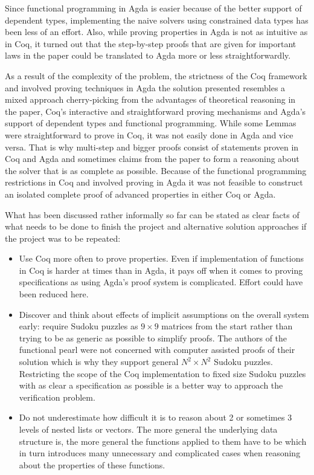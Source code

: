 \documentclass[a4paper,11pt]{article}
\begin{document}
Since functional programming in Agda is easier because of the better support of dependent types, implementing the naive solvers using constrained data types has been less of an effort. Also, while proving properties in Agda is not as intuitive as in Coq, it turned out that the step-by-step proofs that are given for important laws in the paper could be translated to Agda more or less straightforwardly. 

As a result of the complexity of the problem, the strictness of the Coq framework and involved proving techniques in Agda the solution presented resembles a mixed approach cherry-picking from the advantages of theoretical reasoning in the paper, Coq's interactive and straightforward proving mechanisms and Agda's support of dependent types and functional programming. While some Lemmas were straightforward to prove in Coq, it was not easily done in Agda and vice versa. That is why multi-step and bigger proofs consist of statements proven in Coq and Agda and sometimes claims from the paper to form a reasoning about the solver that is as complete as possible. Because of the functional programming restrictions in Coq and involved proving in Agda it was not feasible to construct an isolated complete proof of advanced properties in either Coq or Agda.

What has been discussed rather informally so far can be stated as clear facts of what needs to be done to finish the project and alternative solution approaches if the project was to be repeated:
\begin{itemize}
  \item Use Coq more often to prove properties. Even if implementation of functions in Coq is harder at times than in Agda, it pays off when it comes to proving specifications as using Agda's proof system is complicated. Effort could have been reduced here.
  \item Discover and think about effects of implicit assumptions on the overall system early: require Sudoku puzzles as \(9 \times 9\) matrices from the start rather than trying to be as generic as possible to simplify proofs. The authors of the functional pearl were not concerned with computer assisted proofs of their solution which is why they support general \(N^2 \times N^2\) Sudoku puzzles. Restricting the scope of the Coq implementation to fixed size Sudoku puzzles with as clear a specification as possible is a better way to approach the verification problem.
  \item Do not underestimate how difficult it is to reason about 2 or sometimes 3 levels of nested lists or vectors. The more general the underlying data structure is, the more general the functions applied to them have to be which in turn introduces many unnecessary and complicated cases when reasoning about the properties of these functions.
\end{itemize}
\end{document}
